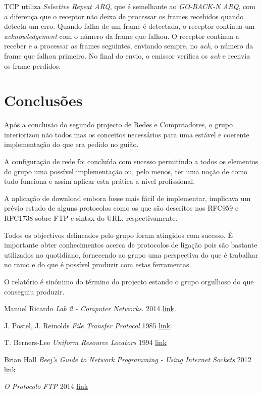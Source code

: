 \documentclass[a4paper]{article}
\begin{document}
TCP utiliza \textit{Selective Repeat ARQ}, que é semelhante ao \textit{GO-BACK-N ARQ}, com a diferença que o receptor não deixa de processar os frames recebidos quando detecta um erro. Quando falha de um frame é detectada, o receptor continua um \textit{acknowledgement} com o número da frame que falhou. O receptor continua a receber e a processar as frames seguintes, enviando sempre, no \textit{ack}, o número da frame que falhou primeiro. No final do envio, o emissor verifica os \textit{ack} e reenvia os frame perdidos.

\section{Conclusões}
Após a conclusão do segundo projecto de Redes e Computadores, o grupo interiorizou não todos mas os conceitos necessários para uma estável e coerente implementação do que era pedido no guião.

\hfill

A configuração de rede foi concluída com sucesso permitindo a todos os elementos do grupo uma possível implementação ou, pelo menos, ter uma noção de como tudo funciona e assim aplicar esta prática a nível profissional.

A aplicação de download embora fosse mais fácil de implementar, implicava um prévio estudo de alguns protocolos como os que são descritos nos RFC959 e RFC1738 sobre FTP e sintax do URL, respectivamente.

Todos os objectivos delineados pelo grupo foram atingidos com sucesso. É importante obter conhecimentos acerca de protocolos de ligação pois são bastante utilizados no quotidiano, fornecendo ao grupo uma perspectiva do que é trabalhar no ramo e do que é possível produzir com estas ferramentas.

\hfill

O relatório é sinónimo do término do projecto estando o grupo orgulhoso do que conseguiu produzir.

\clearpage
{}
\renewcommand\refname{Referências}

\begin{thebibliography}{5}
   Manuel Ricardo {\em Lab 2 - Computer Networks.}  2014 \href{http://moodle.up.pt/pluginfile.php/120587/mod_resource/content/3/lab2.pdf}{link}.

   J. Postel, J. Reinolds {\em File Transfer Protocol} 1985 \href{https://www.ietf.org/rfc/rfc959.txt}{link}.

   T. Berners-Lee {\em Uniform Resource Locators} 1994 \href{https://www.ietf.org/rfc/rfc1738.txt}{link}

   Brian Hall {\em Beej's Guide to Network Programming - Using Internet Sockets} 2012 \href{http://www.beej.us/guide/bgnet/output/html/multipage/}{link}

   {\em O Protocolo FTP} 2014 \href{  http://pt.kioskea.net/contents/265-o-protocolo-ftp-file-transfer-protocol}{link}
\end{thebibliography}
\end{document}
